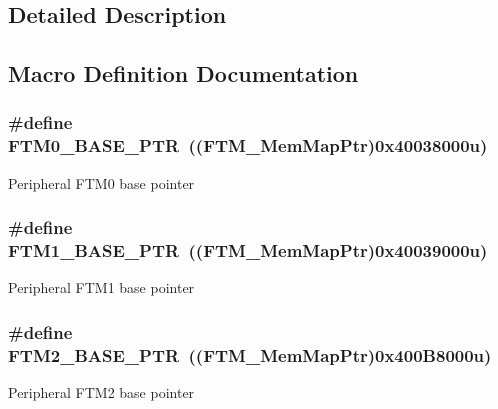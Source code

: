 \subsection{Detailed Description}


\subsection{Macro Definition Documentation}
\hypertarget{group___f_t_m___peripheral_gae712c29b7abcf338d8f8f6418683fa66}{}
\subsubsection[{F\+T\+M0\+\_\+\+B\+A\+S\+E\+\_\+\+P\+T\+R}]{\setlength{\rightskip}{0pt plus 5cm}\#define F\+T\+M0\+\_\+\+B\+A\+S\+E\+\_\+\+P\+T\+R~(({\bf F\+T\+M\+\_\+\+Mem\+Map\+Ptr})0x40038000u)}\label{group___f_t_m___peripheral_gae712c29b7abcf338d8f8f6418683fa66}
Peripheral F\+T\+M0 base pointer \hypertarget{group___f_t_m___peripheral_ga38115fba8eadfc94b2fc411f45906002}{}
\subsubsection[{F\+T\+M1\+\_\+\+B\+A\+S\+E\+\_\+\+P\+T\+R}]{\setlength{\rightskip}{0pt plus 5cm}\#define F\+T\+M1\+\_\+\+B\+A\+S\+E\+\_\+\+P\+T\+R~(({\bf F\+T\+M\+\_\+\+Mem\+Map\+Ptr})0x40039000u)}\label{group___f_t_m___peripheral_ga38115fba8eadfc94b2fc411f45906002}
Peripheral F\+T\+M1 base pointer \hypertarget{group___f_t_m___peripheral_ga897564efeaf1be1f991305d294eda3d6}{}
\subsubsection[{F\+T\+M2\+\_\+\+B\+A\+S\+E\+\_\+\+P\+T\+R}]{\setlength{\rightskip}{0pt plus 5cm}\#define F\+T\+M2\+\_\+\+B\+A\+S\+E\+\_\+\+P\+T\+R~(({\bf F\+T\+M\+\_\+\+Mem\+Map\+Ptr})0x400\+B8000u)}\label{group___f_t_m___peripheral_ga897564efeaf1be1f991305d294eda3d6}
Peripheral F\+T\+M2 base pointer \hypertarget{group___f_t_m___peripheral_ga32dd0c357080d5680c0c5b3cf821adab}{}
